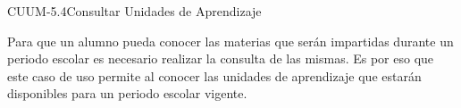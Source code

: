 \begin{UseCase}{CUUM-5.4}{Consultar Unidades de Aprendizaje}
	{
		Para que un alumno pueda conocer las materias que serán impartidas durante un periodo escolar es necesario realizar la consulta de las mismas. Es por eso que este caso de uso permite al  conocer las unidades de aprendizaje que estarán disponibles para un periodo escolar vigente.
			
		}
		
		
		

\end{UseCase}
